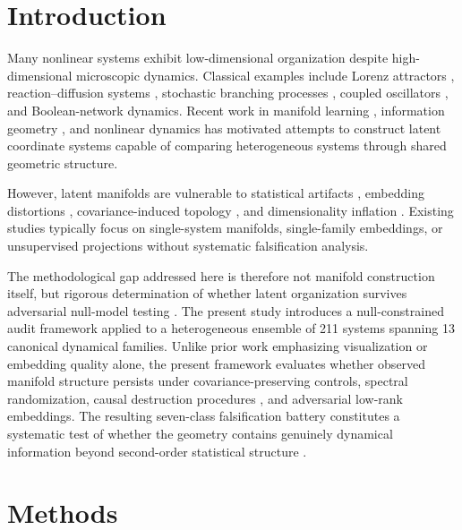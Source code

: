 \documentclass[%
 aip,
 chaos,
 amsmath,amssymb,
 reprint,
]{revtex4-2}
\begin{document}
\section{Introduction}

Many nonlinear systems exhibit low-dimensional organization despite high-dimensional microscopic dynamics. Classical examples include Lorenz attractors \cite{lorenz1963deterministic}, reaction--diffusion systems \cite{prigogine1968dissipative}, stochastic branching processes \cite{feigenbaum1978quantitative}, coupled oscillators \cite{vanderpol1927forced}, and Boolean-network dynamics. Recent work in manifold learning \cite{tenenbaum2000global, roweis2000nonlinear, belkin2003laplacian, mcinnes2018umap}, information geometry \cite{amari2016information, amari1982differential}, and nonlinear dynamics \cite{strogatz2015nonlinear, guckenheimer1983nonlinear} has motivated attempts to construct latent coordinate systems capable of comparing heterogeneous systems through shared geometric structure.

However, latent manifolds are vulnerable to statistical artifacts \cite{theiler1990estimating}, embedding distortions \cite{donoho2000intrinsic}, covariance-induced topology \cite{costa2007intrinsic}, and dimensionality inflation \cite{verleysen2005curse}. Existing studies typically focus on single-system manifolds, single-family embeddings, or unsupervised projections without systematic falsification analysis.

The methodological gap addressed here is therefore not manifold construction itself, but rigorous determination of whether latent organization survives adversarial null-model testing \cite{cover1991elements, villani2009optimal}. The present study introduces a null-constrained audit framework applied to a heterogeneous ensemble of 211 systems spanning 13 canonical dynamical families. Unlike prior work emphasizing visualization or embedding quality alone, the present framework evaluates whether observed manifold structure persists under covariance-preserving controls, spectral randomization, causal destruction procedures \cite{crutchfield1986equivalence}, and adversarial low-rank embeddings. The resulting seven-class falsification battery constitutes a systematic test of whether the geometry contains genuinely dynamical information beyond second-order statistical structure \cite{peyre2019optimal}.

\section{Methods}
\end{document}
